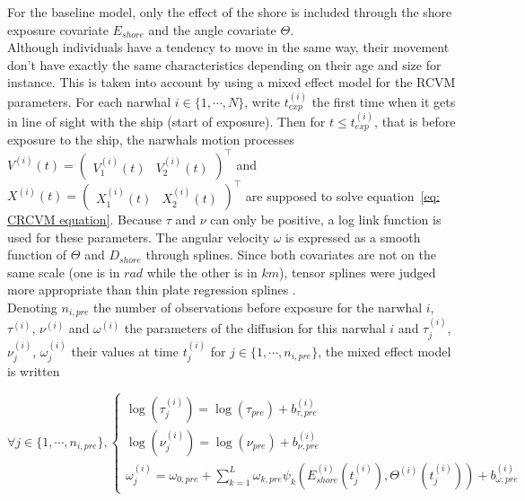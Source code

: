 \documentclass[11pt]{article}
\newcommand {\1}{\mathbb{1}}
\begin{document}
For the baseline model, only the effect of the shore is included through the shore exposure covariate $E_{shore}$ and the angle covariate $\Theta$.\\
Although individuals have a tendency to move in the same way, their movement don't have exactly the same characteristics depending on their age and size for instance. This is taken into account by using a mixed effect model for the RCVM parameters.
For each narwhal $i \in \{1, \cdots, N\}$, write $t_{exp}^{(i)}$ the first time when it gets in line of sight with the ship (start of exposure). Then for $t \leq t_{exp}^{(i)}$, that is before exposure to the ship, the narwhals motion processes $V^{(i)}(t)=\begin{pmatrix} V^{(i)}_1(t) & V^{(i)}_2(t) \end{pmatrix}^\top$ and $X^{(i)}(t)=\begin{pmatrix} X^{(i)}_1(t) & X^{(i)}_2(t) \end{pmatrix}^\top$ are supposed to solve equation~\ref{eq: CRCVM equation}. Because $\tau$ and $\nu$ can only be positive, a log link function is used for these parameters. The angular velocity $\omega$ is expressed as a smooth function of $\Theta$ and $D_{shore}$ through splines. Since both covariates are not on the same scale (one is in $rad$ while the other is in $km$), tensor splines were judged more appropriate than thin plate regression splines \cite{wood_generalized_2017}.\\

Denoting $n_{i,pre}$ the number of observations before exposure for the narwhal $i$, $\tau^{(i)}$, $\nu^{(i)}$  and $\omega^{(i)}$ the parameters of the diffusion for this narwhal $i$ and  $\tau^{(i)}_j$, $\nu_j^{(i)}$, $\omega_j^{(i)}$ their values at time $t_j^{(i)}$ for $j \in \{1, \cdots,n_{i,pre}\}$,  the mixed effect model is written



\begin{equation} 
	\forall j \in \{1,\cdots, n_{i,pre}\},
	\left\{
	\begin{array}{l}
		
		\log(\tau^{(i)}_j)=\log(\tau_{pre})+b_{\tau,pre}^{(i)} \\
		\log(\nu^{(i)}_j)=\log(\nu_{pre})+b_{\nu,pre}^{(i)}  \\
		\omega^{(i)}_j=\omega_{0,pre}+\sum_{k=1}^{L} \omega_{k,pre} \psi_k(E_{shore}^{(i)}(t_j^{(i)}),\Theta^{(i)}(t_j^{(i)})) + b_{\omega,pre}^{(i)}
	\end{array}
	\right.
	\label{eq: approximate baseline model}
\end{equation}
\end{document}
